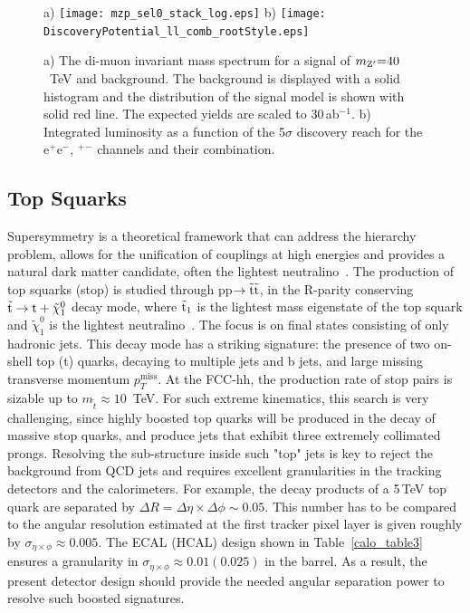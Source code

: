 \documentclass[11pt,twoside,a4paper]{cernrep}
\begin{document}
%
%
%
\begin{figure}
  \centering
  a)
  \texttt{[image: mzp\_sel0\_stack\_log.eps]}
  b)
  \texttt{[image: DiscoveryPotential\_ll\_comb\_rootStyle.eps]}
  \caption{a) The di-muon invariant mass spectrum for a signal of $m_{\rm Z^{\prime}} {=} 40$~TeV and background. The background is displayed with a solid histogram and the distribution of the signal model is shown with solid red line. The expected yields are scaled to 30\,ab$^{-1}$. b) Integrated luminosity as a function of the 5$\sigma$ discovery reach for the e$^+$e$^-$, \textmu$^+$\textmu$^-$ channels and their combination.}
  \label{zprime}
\end{figure}


\subsection{Top Squarks}

Supersymmetry is a theoretical framework that can address the hierarchy problem, allows for the unification of couplings at high energies and provides a natural dark matter candidate, often the lightest neutralino~\cite{Miyazawa:1966mfa,Golfand:1971iw,Neveu:1971rx,Neveu:1971iv,Ramond:1971gb,Volkov:1973ix,Wess:1973kz,Wess:1974tw}. The production of top squarks (stop) is studied through pp$\rightarrow \tilde{\rm t} \tilde{\rm t}$, in the R-parity conserving $\rm \tilde{t} \rightarrow t + \tilde{\chi}_1^{0}$ decay mode, where $\rm \tilde{t}_{1}$ is the lightest mass eigenstate of the top squark and $\tilde{\chi}_1^{0}$ is the lightest neutralino~\cite{Dimopoulos:1981zb,Fayet:1976et,Fayet:1977yc,Fayet:1979sa,Farrar:1978xj}. The focus is on final states consisting of only hadronic jets. This decay mode has a striking signature: the presence of two on-shell top (t) quarks, decaying to multiple jets and b jets, and large missing transverse momentum $p_T^{\mathrm{miss}}$. At the FCC-hh, the production rate of stop pairs is sizable up to $m_{\tilde{t}} \approx 10$~TeV. For such extreme kinematics, this search is very challenging, since highly boosted top quarks will be produced in the decay of massive stop quarks, and produce jets that exhibit three extremely collimated prongs. Resolving the sub-structure inside such "top" jets is key to reject the background from QCD jets and requires excellent granularities in the tracking detectors and the calorimeters. For example, the decay products of a 5\,TeV top quark are separated by $\Delta R {=} \Delta \eta \times \Delta \phi \sim 0.05$. This number has to be compared to the angular resolution estimated at the first tracker pixel layer is given roughly by $\sigma_{\eta \times \phi} \approx 0.005$. The ECAL (HCAL) design shown in Table~\ref{calo_table3} ensures a granularity in $\sigma_{\eta \times \phi} \approx 0.01 (0.025)$ in the barrel. As a result, the present detector design should provide the needed angular separation power to resolve such boosted signatures.
\end{document}
